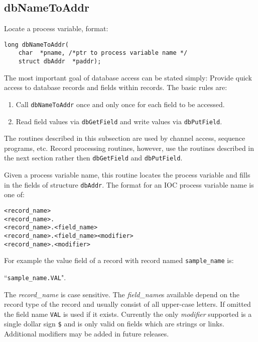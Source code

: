 \subsection{dbNameToAddr}

Locate a process variable, format:

\begin{verbatim}
long dbNameToAddr(
    char  *pname, /*ptr to process variable name */
    struct dbAddr  *paddr);
\end{verbatim}

The most important goal of database access can be stated simply: Provide quick access to database records and fields 
within records. The basic rules are:

\begin{enumerate}

\item Call \verb|dbNameToAddr| once and only once for each field to be accessed.

\item Read field values via \verb|dbGetField| and write values via \verb|dbPutField|.

\end{enumerate}

The routines described in this subsection are used by channel access, sequence programs, etc. Record processing routines, 
however, use the routines described in the next section rather then \verb|dbGetField| and \verb|dbPutField|.

Given a process variable name, this routine locates the process variable and fills in the fields of structure \verb|dbAddr|. The 
format for an IOC process variable name is one of:

\begin{verbatim}
<record_name>
<record_name>.
<record_name>.<field_name>
<record_name>.<field_name><modifier>
<record_name>.<modifier>
\end{verbatim}

For example the value field of a record with record named \verb|sample_name| is:

       ``\verb|sample_name.VAL|".

The \emph{record\_name} is case sensitive. The \emph{field\_name}s available depend on the record type of the record and usually consist 
of all upper-case letters. If omitted the field name \verb|VAL| is used if it exists. Currently the only \emph{modifier} supported is a single 
dollar sign \verb|$| and is only valid on fields which are strings or links. Additional modifiers may be added in future releases.

